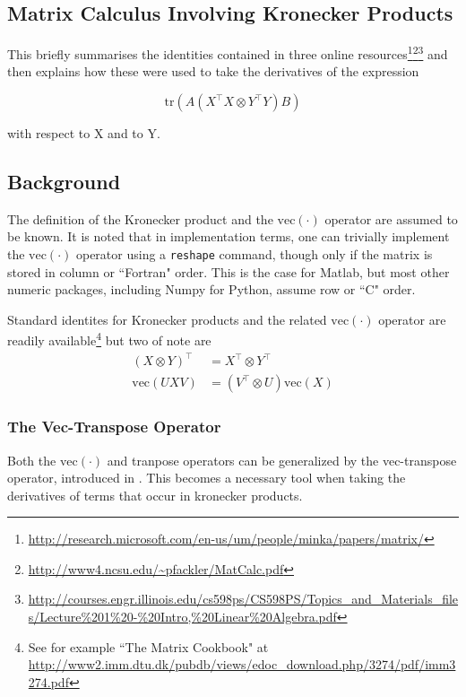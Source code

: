 \documentclass[10pt,fleqn]{article}
\newcommand \vecf[1] {
    \text{vec}\left(#1\right)
}
\newcommand \tr { \text{tr} }
\newcommand \T { ^\top }
\newcommand \Tr[1]   { \tr \left(  {#1}  \right) }
\begin{document}
\begin{appendices}


\section{Matrix Calculus Involving Kronecker Products}
\label{sec:trace-kro-calculus}
This briefly summarises the identities contained in three online resources\footnote{\url{http://research.microsoft.com/en-us/um/people/minka/papers/matrix/}}\footnote{\url{http://www4.ncsu.edu/~pfackler/MatCalc.pdf}}\footnote{\url{http://courses.engr.illinois.edu/cs598ps/CS598PS/Topics_and_Materials_files/Lecture\%201\%20-\%20Intro,\%20Linear\%20Algebra.pdf}} and then explains how these were used to take the derivatives of the expression

\begin{equation}
\Tr{A(X\T X \otimes Y\T Y) B}
\end{equation}

with respect to X and to Y.

\subsection{Background}
The definition of the Kronecker product and the $\vecf{\cdot}$ operator are assumed to be known. It is noted that in implementation terms, one can trivially implement the $\vecf{\cdot}$ operator using a \texttt{reshape} command, though only if the matrix is stored in column or ``Fortran" order. This is the case for Matlab, but most other numeric packages, including Numpy for Python, assume row or ``C" order. 

Standard identites for Kronecker products and the related $\vecf{\cdot}$ operator are readily available\footnote{See for example ``The Matrix Cookbook" at \url{http://www2.imm.dtu.dk/pubdb/views/edoc_download.php/3274/pdf/imm3274.pdf}} but two of note are
\begin{align}
(X \otimes Y)\T & = X\T \otimes Y\T  \label{eqn:otimes_tranpose}\\
\vecf{UXV} & = (V\T \otimes U)\vecf{X} \label{eqn:vec_to_otimes}
\end{align}

\subsubsection{The Vec-Transpose Operator}
\label{sec:vec-transpose}
Both the $\vecf{\cdot}$ and tranpose operators can be generalized by the vec-transpose operator, introduced in \cite{Wandell1992}. This becomes a necessary tool when taking the derivatives of terms that occur in kronecker products.


\end{appendices}
\end{document}
